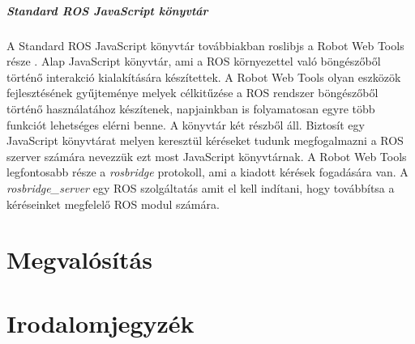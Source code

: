 \documentclass[12pt,a4paper,oneside]{report} %
\begin{document}
\paragraph{Standard ROS JavaScript könyvtár}
\label{roslibjs}
A Standard ROS JavaScript könyvtár továbbiakban roslibjs a Robot Web Tools része \cite{toris2015robot}.  Alap JavaScript könyvtár, ami a ROS környezettel való böngészőből történő interakció kialakítására készítettek. A Robot Web Tools olyan eszközök fejlesztésének gyűjteménye melyek célkitűzése a ROS rendszer böngészőből történő használatához készítenek, napjainkban is folyamatosan egyre több funkciót lehetséges elérni benne. A könyvtár két részből áll. Biztosít egy JavaScript könyvtárat melyen keresztül kéréseket tudunk megfogalmazni a ROS szerver számára nevezzük ezt most JavaScript könyvtárnak. A Robot Web Tools legfontosabb része a \textit{rosbridge} protokoll, ami a kiadott kérések fogadására van. A \textit{rosbridge\_server} egy ROS szolgáltatás amit el kell indítani, hogy továbbítsa a kéréseinket megfelelő ROS modul számára.


\chapter{Megvalósítás}
\chapter*{Irodalomjegyzék}
\printbibliography[heading=none]
\newpage
\listoffigures
{}
\end{document}
